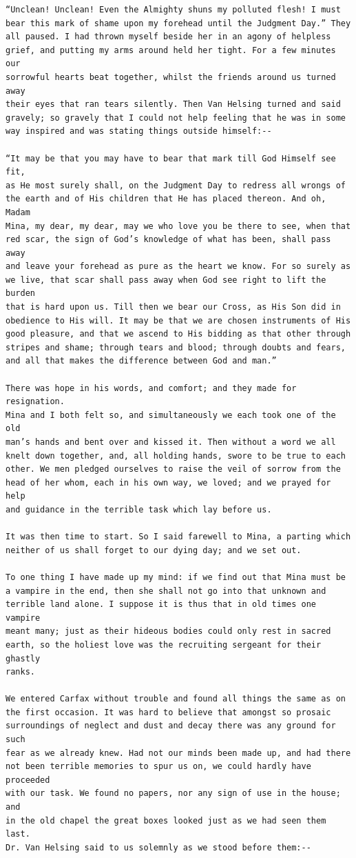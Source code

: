 \documentclass{article}
\begin{document}
\begin{verbatim}
“Unclean! Unclean! Even the Almighty shuns my polluted flesh! I must
bear this mark of shame upon my forehead until the Judgment Day.” They
all paused. I had thrown myself beside her in an agony of helpless
grief, and putting my arms around held her tight. For a few minutes our
sorrowful hearts beat together, whilst the friends around us turned away
their eyes that ran tears silently. Then Van Helsing turned and said
gravely; so gravely that I could not help feeling that he was in some
way inspired and was stating things outside himself:--

“It may be that you may have to bear that mark till God Himself see fit,
as He most surely shall, on the Judgment Day to redress all wrongs of
the earth and of His children that He has placed thereon. And oh, Madam
Mina, my dear, my dear, may we who love you be there to see, when that
red scar, the sign of God’s knowledge of what has been, shall pass away
and leave your forehead as pure as the heart we know. For so surely as
we live, that scar shall pass away when God see right to lift the burden
that is hard upon us. Till then we bear our Cross, as His Son did in
obedience to His will. It may be that we are chosen instruments of His
good pleasure, and that we ascend to His bidding as that other through
stripes and shame; through tears and blood; through doubts and fears,
and all that makes the difference between God and man.”

There was hope in his words, and comfort; and they made for resignation.
Mina and I both felt so, and simultaneously we each took one of the old
man’s hands and bent over and kissed it. Then without a word we all
knelt down together, and, all holding hands, swore to be true to each
other. We men pledged ourselves to raise the veil of sorrow from the
head of her whom, each in his own way, we loved; and we prayed for help
and guidance in the terrible task which lay before us.

It was then time to start. So I said farewell to Mina, a parting which
neither of us shall forget to our dying day; and we set out.

To one thing I have made up my mind: if we find out that Mina must be
a vampire in the end, then she shall not go into that unknown and
terrible land alone. I suppose it is thus that in old times one vampire
meant many; just as their hideous bodies could only rest in sacred
earth, so the holiest love was the recruiting sergeant for their ghastly
ranks.

We entered Carfax without trouble and found all things the same as on
the first occasion. It was hard to believe that amongst so prosaic
surroundings of neglect and dust and decay there was any ground for such
fear as we already knew. Had not our minds been made up, and had there
not been terrible memories to spur us on, we could hardly have proceeded
with our task. We found no papers, nor any sign of use in the house; and
in the old chapel the great boxes looked just as we had seen them last.
Dr. Van Helsing said to us solemnly as we stood before them:--


\end{verbatim}
\end{document}
